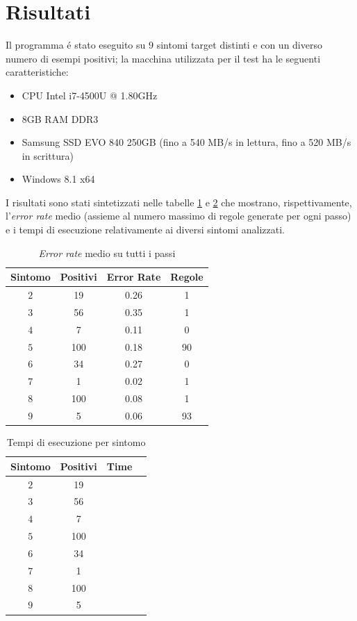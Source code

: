 \documentclass[preprint]{acm_proc_article-sp}
\begin{document}
\section{Risultati}
Il programma \'e stato eseguito su $9$ sintomi target distinti e con un diverso numero di esempi positivi; la macchina utilizzata per il test ha le seguenti caratteristiche:
\begin{itemize}
\item CPU Intel i7-4500U @ 1.80GHz
\item 8GB RAM DDR3
\item Samsung SSD EVO 840 250GB (fino a 540 MB/s in lettura, fino a 520 MB/s in scrittura)
\item Windows 8.1 x64
\end{itemize}

I risultati sono stati sintetizzati nelle tabelle \ref{table:risultati-errori} e \ref{table:risultati-tempi} che mostrano, rispettivamente, l'\textit{error rate} medio (assieme al numero massimo di regole generate per ogni passo) e i tempi di esecuzione relativamente ai diversi sintomi analizzati.

\begin{table}[h]
\centering
\begin{tabular}{|c|c|c|c|} \hline
\textbf{Sintomo} & \textbf{Positivi} & \textbf{Error Rate} & \textbf{Regole} \\ \hline \hline
$2$ & 19 & 0.26 & 1 \\ \hline
$3$ & 56 & 0.35 & 1 \\ \hline
$4$ & 7 & 0.11 & 0 \\ \hline
$5$ & 100 & 0.18 & 90 \\ \hline
$6$ & 34 & 0.27 & 0 \\ \hline
$7$ & 1 & 0.02 & 1 \\ \hline
$8$ & 100 & 0.08 & 1 \\ \hline
$9$ & 5 & 0.06 & 93 \\
\hline\end{tabular}
\caption{\textit{Error rate} medio su tutti i passi}
\label{table:risultati-errori}
\end{table}

\begin{table}[h]
\centering
\begin{tabular}{|c|c|c|c|} \hline
\textbf{Sintomo} & \textbf{Positivi} & \textbf{Time} \\ \hline \hline
$2$ & 19 &  \\ \hline
$3$ & 56 &  \\ \hline
$4$ & 7 &  \\ \hline
$5$ & 100 &  \\ \hline
$6$ & 34 &  \\ \hline
$7$ & 1 &  \\ \hline
$8$ & 100 &  \\ \hline
$9$ & 5 &  \\
\hline\end{tabular}
\caption{Tempi di esecuzione per sintomo}
\label{table:risultati-tempi}
\end{table}
\end{document}
